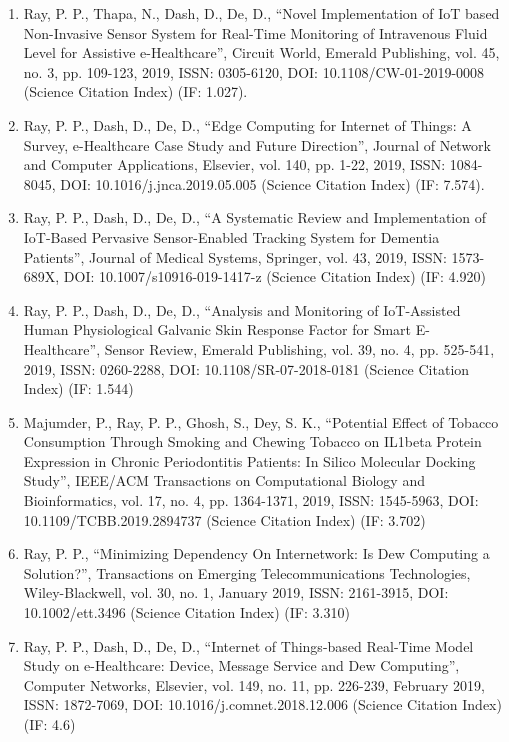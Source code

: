 \documentclass[11pt,a4paper]{moderncv}
\begin{document}
\begin{adjustwidth}{6em}{0pt}
\begin{enumerate}
		\item 	Ray, P. P., Thapa, N., Dash, D., De, D., “Novel Implementation of IoT based Non-Invasive Sensor System for Real-Time Monitoring of Intravenous Fluid Level for Assistive e-Healthcare”, Circuit World, Emerald Publishing, vol. 45, no. 3, pp. 109-123, 2019, ISSN: 0305-6120, DOI: 10.1108/CW-01-2019-0008 (Science Citation Index) (IF: 1.027). 
		
		\item Ray, P. P., Dash, D., De, D., “Edge Computing for Internet of Things: A Survey, e-Healthcare Case Study and Future Direction”, Journal of Network and Computer Applications, Elsevier, vol. 140, pp. 1-22, 2019, ISSN: 1084-8045, DOI: 10.1016/j.jnca.2019.05.005 (Science Citation Index) (IF: 7.574). 
		
		\item Ray, P. P., Dash, D., De, D., “A Systematic Review and Implementation of IoT-Based Pervasive Sensor-Enabled Tracking System for Dementia Patients”, Journal of Medical Systems, Springer, vol. 43, 2019, ISSN: 1573-689X, DOI: 10.1007/s10916-019-1417-z (Science Citation Index) (IF: 4.920) 
		
		\item Ray, P. P., Dash, D., De, D., “Analysis and Monitoring of IoT-Assisted Human Physiological Galvanic Skin Response Factor for Smart E-Healthcare”, Sensor Review, Emerald Publishing, vol. 39, no. 4, pp. 525-541, 2019, ISSN: 0260-2288, DOI: 10.1108/SR-07-2018-0181 (Science Citation Index) (IF: 1.544) 
		
		\item Majumder, P., Ray, P. P., Ghosh, S., Dey, S. K., “Potential Effect of Tobacco Consumption Through Smoking and Chewing Tobacco on IL1beta Protein Expression in Chronic Periodontitis Patients: In Silico Molecular Docking Study”, IEEE/ACM Transactions on Computational Biology and Bioinformatics, vol. 17, no. 4, pp. 1364-1371, 2019, ISSN: 1545-5963, DOI: 10.1109/TCBB.2019.2894737 (Science Citation Index) (IF: 3.702)
		
		\item Ray, P. P., “Minimizing Dependency On Internetwork: Is Dew Computing a Solution?”, Transactions on Emerging Telecommunications Technologies, Wiley-Blackwell, vol. 30, no. 1, January 2019, ISSN: 2161-3915, DOI: 10.1002/ett.3496 (Science Citation Index) (IF: 3.310)
		
		\item Ray, P. P., Dash, D., De, D., “Internet of Things-based Real-Time Model Study on e-Healthcare: Device, Message Service and Dew Computing”, Computer Networks, Elsevier, vol. 149, no. 11, pp. 226-239, February 2019, ISSN: 1872-7069, DOI: 10.1016/j.comnet.2018.12.006 (Science Citation Index) (IF: 4.6)
		

\end{enumerate}
\end{adjustwidth}
\end{document}
